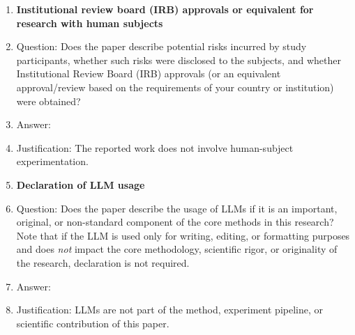 \begin{enumerate}
\item {\bf Institutional review board (IRB) approvals or equivalent for research with human subjects}
  \item[] Question: Does the paper describe potential risks incurred by study participants, whether such risks were disclosed to the subjects, and whether Institutional Review Board (IRB) approvals (or an equivalent approval/review based on the requirements of your country or institution) were obtained?
  \item[] Answer: \answerNA{}
  \item[] Justification: The reported work does not involve human-subject experimentation.

\item {\bf Declaration of LLM usage}
  \item[] Question: Does the paper describe the usage of LLMs if it is an important, original, or non-standard component of the core methods in this research? Note that if the LLM is used only for writing, editing, or formatting purposes and does \emph{not} impact the core methodology, scientific rigor, or originality of the research, declaration is not required.
  \item[] Answer: \answerNA{}
  \item[] Justification: LLMs are not part of the method, experiment pipeline, or scientific contribution of this paper.

\end{enumerate}
